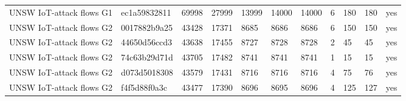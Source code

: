 \begin{tabular}{lllllllllll}
UNSW IoT-attack flows G1 & ec1a59832811 & 69998 & 27999 & 13999 & 14000 & 14000 & 6 & 180 & 180 & yes \\
UNSW IoT-attack flows G2 & 0017882b9a25 & 43428 & 17371 & 8685 & 8686 & 8686 & 6 & 150 & 150 & yes \\
UNSW IoT-attack flows G2 & 44650d56ccd3 & 43638 & 17455 & 8727 & 8728 & 8728 & 2 & 45 & 45 & yes \\
UNSW IoT-attack flows G2 & 74c63b29d71d & 43705 & 17482 & 8741 & 8741 & 8741 & 1 & 15 & 15 & yes \\
UNSW IoT-attack flows G2 & d073d5018308 & 43579 & 17431 & 8716 & 8716 & 8716 & 4 & 75 & 76 & yes \\
UNSW IoT-attack flows G2 & f4f5d88f0a3c & 43477 & 17390 & 8696 & 8695 & 8696 & 4 & 125 & 127 & yes \\
\bottomrule
\end{tabular}
